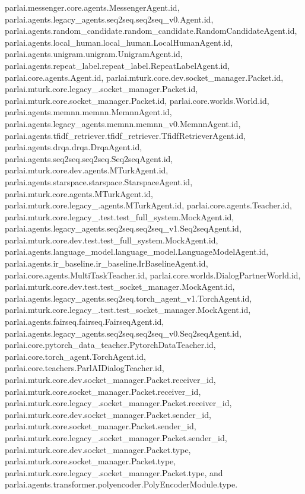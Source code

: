 parlai.\+messenger.\+core.\+agents.\+Messenger\+Agent.\+id, parlai.\+agents.\+legacy\+\_\+agents.\+seq2seq.\+seq2seq\+\_\+v0.\+Agent.\+id, parlai.\+agents.\+random\+\_\+candidate.\+random\+\_\+candidate.\+Random\+Candidate\+Agent.\+id, parlai.\+agents.\+local\+\_\+human.\+local\+\_\+human.\+Local\+Human\+Agent.\+id, parlai.\+agents.\+unigram.\+unigram.\+Unigram\+Agent.\+id, parlai.\+agents.\+repeat\+\_\+label.\+repeat\+\_\+label.\+Repeat\+Label\+Agent.\+id, parlai.\+core.\+agents.\+Agent.\+id, parlai.\+mturk.\+core.\+dev.\+socket\+\_\+manager.\+Packet.\+id, parlai.\+mturk.\+core.\+legacy\+\_.\+socket\+\_\+manager.\+Packet.\+id, parlai.\+mturk.\+core.\+socket\+\_\+manager.\+Packet.\+id, parlai.\+core.\+worlds.\+World.\+id, parlai.\+agents.\+memnn.\+memnn.\+Memnn\+Agent.\+id, parlai.\+agents.\+legacy\+\_\+agents.\+memnn.\+memnn\+\_\+v0.\+Memnn\+Agent.\+id, parlai.\+agents.\+tfidf\+\_\+retriever.\+tfidf\+\_\+retriever.\+Tfidf\+Retriever\+Agent.\+id, parlai.\+agents.\+drqa.\+drqa.\+Drqa\+Agent.\+id, parlai.\+agents.\+seq2seq.\+seq2seq.\+Seq2seq\+Agent.\+id, parlai.\+mturk.\+core.\+dev.\+agents.\+M\+Turk\+Agent.\+id, parlai.\+agents.\+starspace.\+starspace.\+Starspace\+Agent.\+id, parlai.\+mturk.\+core.\+agents.\+M\+Turk\+Agent.\+id, parlai.\+mturk.\+core.\+legacy\+\_.\+agents.\+M\+Turk\+Agent.\+id, parlai.\+core.\+agents.\+Teacher.\+id, parlai.\+mturk.\+core.\+legacy\+\_.\+test.\+test\+\_\+full\+\_\+system.\+Mock\+Agent.\+id, parlai.\+agents.\+legacy\+\_\+agents.\+seq2seq.\+seq2seq\+\_\+v1.\+Seq2seq\+Agent.\+id, parlai.\+mturk.\+core.\+dev.\+test.\+test\+\_\+full\+\_\+system.\+Mock\+Agent.\+id, parlai.\+agents.\+language\+\_\+model.\+language\+\_\+model.\+Language\+Model\+Agent.\+id, parlai.\+agents.\+ir\+\_\+baseline.\+ir\+\_\+baseline.\+Ir\+Baseline\+Agent.\+id, parlai.\+core.\+agents.\+Multi\+Task\+Teacher.\+id, parlai.\+core.\+worlds.\+Dialog\+Partner\+World.\+id, parlai.\+mturk.\+core.\+dev.\+test.\+test\+\_\+socket\+\_\+manager.\+Mock\+Agent.\+id, parlai.\+agents.\+legacy\+\_\+agents.\+seq2seq.\+torch\+\_\+agent\+\_\+v1.\+Torch\+Agent.\+id, parlai.\+mturk.\+core.\+legacy\+\_.\+test.\+test\+\_\+socket\+\_\+manager.\+Mock\+Agent.\+id, parlai.\+agents.\+fairseq.\+fairseq.\+Fairseq\+Agent.\+id, parlai.\+agents.\+legacy\+\_\+agents.\+seq2seq.\+seq2seq\+\_\+v0.\+Seq2seq\+Agent.\+id, parlai.\+core.\+pytorch\+\_\+data\+\_\+teacher.\+Pytorch\+Data\+Teacher.\+id, parlai.\+core.\+torch\+\_\+agent.\+Torch\+Agent.\+id, parlai.\+core.\+teachers.\+Parl\+A\+I\+Dialog\+Teacher.\+id, parlai.\+mturk.\+core.\+dev.\+socket\+\_\+manager.\+Packet.\+receiver\+\_\+id, parlai.\+mturk.\+core.\+socket\+\_\+manager.\+Packet.\+receiver\+\_\+id, parlai.\+mturk.\+core.\+legacy\+\_.\+socket\+\_\+manager.\+Packet.\+receiver\+\_\+id, parlai.\+mturk.\+core.\+dev.\+socket\+\_\+manager.\+Packet.\+sender\+\_\+id, parlai.\+mturk.\+core.\+socket\+\_\+manager.\+Packet.\+sender\+\_\+id, parlai.\+mturk.\+core.\+legacy\+\_.\+socket\+\_\+manager.\+Packet.\+sender\+\_\+id, parlai.\+mturk.\+core.\+dev.\+socket\+\_\+manager.\+Packet.\+type, parlai.\+mturk.\+core.\+socket\+\_\+manager.\+Packet.\+type, parlai.\+mturk.\+core.\+legacy\+\_.\+socket\+\_\+manager.\+Packet.\+type, and parlai.\+agents.\+transformer.\+polyencoder.\+Poly\+Encoder\+Module.\+type.



